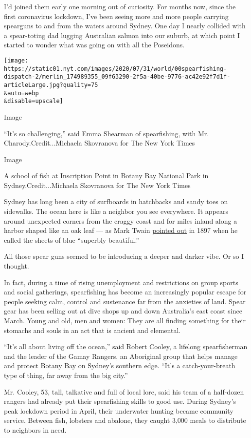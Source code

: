 I'd joined them early one morning out of curiosity. For months now,
since the first coronavirus lockdown, I've been seeing more and more
people carrying spearguns to and from the waters around Sydney. One day
I nearly collided with a spear-toting dad lugging Australian salmon into
our suburb, at which point I started to wonder what was going on with
all the Poseidons.

\texttt{[image: https://static01.nyt.com/images/2020/07/31/world/00spearfishing-dispatch-2/merlin\_174989355\_09f63290-2f5a-40be-9776-ac42e92f7d1f-articleLarge.jpg?quality=75\\\&auto=webp\\\&disable=upscale]}

Image

``It's so challenging,'' said Emma Shearman of spearfishing, with Mr.
Charody.Credit...Michaela Skovranova for The New York Times

Image

A school of fish at Inscription Point in Botany Bay National Park in
Sydney.Credit...Michaela Skovranova for The New York Times

Sydney has long been a city of surfboards in hatchbacks and sandy toes
on sidewalks. The ocean here is like a neighbor you see everywhere. It
appears around unexpected corners from the craggy coast and for miles
inland along a harbor shaped like an oak leaf --- as Mark Twain
\href{https://musingsofaliterarydilettante.wordpress.com/2010/03/28/the-wayward-tourist-mark-twains-adventures-in-australia-by-mark-twain/}{pointed
out} in 1897 when he called the sheets of blue ``superbly beautiful.''

All those spear guns seemed to be introducing a deeper and darker vibe.
Or so I thought.

In fact, during a time of rising unemployment and restrictions on group
sports and social gatherings, spearfishing has become an increasingly
popular escape for people seeking calm, control and sustenance far from
the anxieties of land. Spear gear has been selling out at dive shops up
and down Australia's east coast since March. Young and old, men and
women: They are all finding something for their stomachs and souls in an
act that is ancient and elemental.

``It's all about living off the ocean,'' said Robert Cooley, a lifelong
spearfisherman and the leader of the Gamay Rangers, an Aboriginal group
that helps manage and protect Botany Bay on Sydney's southern edge.
``It's a catch-your-breath type of thing, far away from the big city.''

Mr. Cooley, 53, tall, talkative and full of local lore, said his team of
a half-dozen rangers had already put their spearfishing skills to good
use. During Sydney's peak lockdown period in April, their underwater
hunting became community service. Between fish, lobsters and abalone,
they caught 3,000 meals to distribute to neighbors in need.

